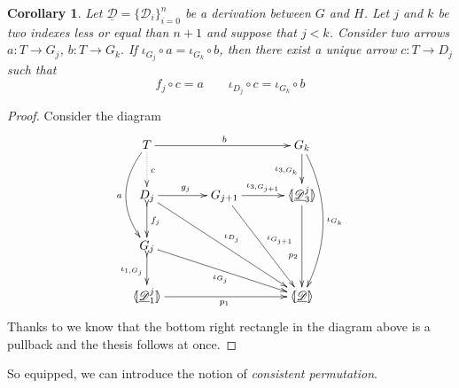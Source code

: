 \documentclass[a4paper]{article}
\def\D{\textbf {\textup{D}}}
\newcommand{\dder}[1]{\mathscr{#1}}
\newcommand{\der}[1]{\underline{\dder{#1}}}
\newcommand{\lpro}{\langle \hspace{-1.85pt}[}
\newcommand{\rpro}{]\hspace{-1.85pt}\rangle}
\newcommand{\tpro}[1]{\lpro \der{#1}\rpro}
\newtheorem{corollary}[theorem]{Corollary}
\theoremstyle{definition}
\begin{document}
\begin{corollary}\label{cor:ele}
	Let $\der{D}=\{\dder{D}_{i}\}_{i=0}^n$ be a derivation between $G$ and $H$. Let $j$ and $k$ be two indexes less or equal than $n+1$ and suppose that $j< k$.  Consider two arrows $a\colon T\to G_j$, $b\colon T\to G_k$. If $\iota_{G_j}\circ a = \iota_{G_k}\circ b$, 
	then  there exist a unique arrow $c\colon T\to D_j $  such that \[f_j\circ c = a\qquad \iota_{D_j}\circ c =\iota_{G_k}\circ b\]
	\end{corollary}
\begin{proof} Consider the diagram
			\[\xymatrix@C=34pt{T  \ar@/_.6cm/[dd]_{a}\ar@{.>}[d]^{c}\ar[rr]^{b}&& G_k \ar[d]_{\iota_{3, G_k}} \ar@/^.6cm/[ddd]^{\iota_{G_k}}\\D_{j} \ar[r]^{g_j} \ar[ddrr]^{\iota_{D_j}}\ar@{>->}[d]^{f_j}& G_{j+1} \ar[r]^-{\iota_{3,G_{j+1}}} \ar[ddr]^{\iota_{G_{j+1}}} & \lpro \der{D}^j_3\rpro \ar[dd]_(.6){p_2} \\ G_j \ar@{>->}[d]_{\iota_{1,G_j}} \ar[drr]_{\iota_{G_j}}\\ \lpro \der{D}^j_1 \rpro \ar[rr]_{p_1}  &&\tpro{D} }\] 
			Thanks to  we know that the bottom right rectangle in the diagram above is a pullback and the thesis follows at once.
\end{proof}	
	
	
So equipped, we can introduce the notion of \emph{consistent permutation}.
\end{document}
